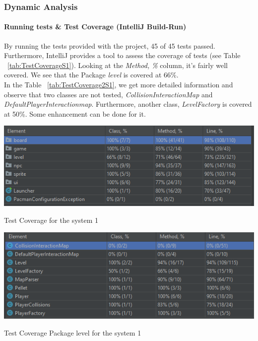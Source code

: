 \documentclass[]{article}
\begin{document}
\subsubsection{Dynamic Analysis}

\paragraph{Running tests \& Test Coverage (IntelliJ Build-Run)}

By running the tests provided with the project, 45 of 45 tests passed. Furthermore, IntelliJ provides a tool to assess the coverage of tests (see Table ~\ref{tab:TestCoverageS1}). Looking at the \textit{Method, \%} column, it's fairly well covered. We see that the Package \textit{level} is covered at 66\%. \\

In the Table ~\ref{tab:TestCoverage2S1}, we get more detailed information and observe that two classes are not tested, \textit{CollisionInteractionMap} and \textit{DefaultPlayerInteractionmap}. Furthermore, another class, \textit{LevelFactory} is covered at 50\%. Some enhancement can be done for it.

\begin{table}
    \centering
    \includegraphics[width=\linewidth]{imgs/testCoverageS1.PNG}
    \caption{Test Coverage for the system 1}
    \label{tab:TestCoverageS1}
\end{table}

\begin{table}
    \centering
    \includegraphics[width=\linewidth]{imgs/testCoverage2S1.PNG}
    \caption{Test Coverage Package level for the system 1}
    \label{tab:TestCoverage2S1}
\end{table}
\end{document}
